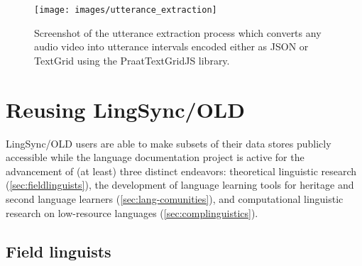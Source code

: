 \documentclass[11pt]{article}
\newcommand{\smalltodo}[2][]
    {\todo[caption={#2}, #1]
    {\tiny#2\normalsize}}
\begin{document}
\begin{figure}
\begin{center}
\texttt{[image: images/utterance\_extraction]}
\caption{Screenshot of the utterance extraction process which converts any audio video into utterance intervals encoded either as JSON or TextGrid using the PraatTextGridJS library.}
\label{utterance_extraction_screenshot}
\end{center}
\end{figure}


\section{Reusing LingSync/OLD}
\label{open-data}

LingSync/OLD users are able to make subsets of their data stores publicly
accessible while the language documentation project is active for the advancement of (at least) three distinct endeavors: 
theoretical linguistic research (\autoref{sec:fieldlinguists}),  the development of language learning tools for
heritage and second language learners (\autoref{sec:lang-comunities}), and  computational linguistic research  on low-resource languages (\autoref{sec:complinguistics}). 



\subsection{Field linguists}
\end{document}
